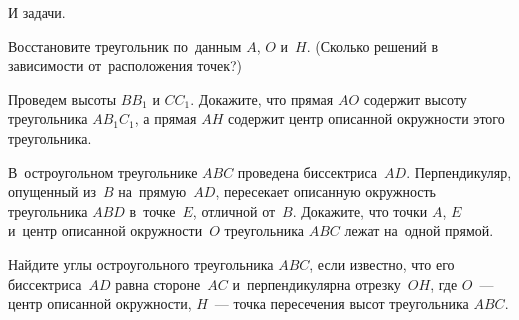 И задачи.

\begin{problems}

\item
Восстановите треугольник по~данным $A$, $O$ и~$H$.
(Сколько решений в зависимости от~расположения точек?)

\item
Проведем высоты $BB_1$ и $CC_1$.
Докажите, что прямая $AO$ содержит высоту треугольника $AB_1C_1$, а прямая $AH$ содержит центр описанной окружности этого треугольника.

\item
В~остроугольном треугольнике $ABC$ проведена биссектриса~$AD$.
Перпендикуляр, опущенный из~$B$ на~прямую~$AD$, пересекает описанную окружность треугольника $ABD$ в~точке~$E$, отличной от~$B$.
Докажите, что точки $A$, $E$ и~центр описанной окружности~$O$ треугольника $ABC$ лежат на~одной прямой.


\item
Найдите углы остроугольного треугольника $ABC$, если известно, что его
биссектриса~$AD$ равна стороне~$AC$ и~перпендикулярна отрезку~$OH$, где $O$~---
центр описанной окружности, $H$~--- точка пересечения высот треугольника $ABC$.

\end{problems}


\endgroup %
